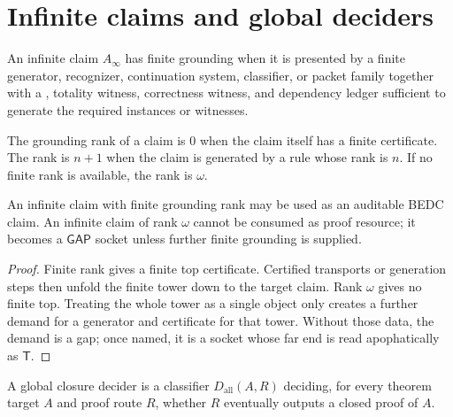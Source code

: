 \section{Infinite claims and global deciders}
\label{sec:legitimate-claim-infinite-global}

\begin{definition}
\label{def:claim-finite-grounding}
An infinite claim $A_{\infty}$ has finite grounding when it is presented by
a finite generator, recognizer, continuation system, classifier, or packet
family together with a \NameCert{}, totality witness, correctness witness,
and dependency ledger sufficient to generate the required instances or
witnesses.
\end{definition}

\begin{definition}
\label{def:claim-grounding-rank}
The grounding rank of a claim is $0$ when the claim itself has a finite
certificate.  The rank is $n+1$ when the claim is generated by a rule whose
rank is $n$.  If no finite rank is available, the rank is $\omega$.
\end{definition}

\begin{theorem}
\label{thm:claim-infinite-claim-closure}
An infinite claim with finite grounding rank may be used as an auditable BEDC
claim.  An infinite claim of rank $\omega$ cannot be consumed as proof
resource; it becomes a $\mathsf{GAP}$ socket unless further finite grounding
is supplied.
\end{theorem}

\begin{proof}
Finite rank gives a finite top certificate.  Certified transports or
generation steps then unfold the finite tower down to the target claim.
Rank $\omega$ gives no finite top.  Treating the whole tower as a single
object only creates a further demand for a generator and certificate for
that tower.  Without those data, the demand is a gap; once named, it is a
socket whose far end is read apophatically as $\mathsf{T}$.
\end{proof}

\begin{definition}
\label{def:claim-global-closure-decider}
A global closure decider is a classifier $D_{\mathrm{all}}(A,R)$ deciding,
for every theorem target $A$ and proof route $R$, whether $R$ eventually
outputs a closed proof of $A$.
\end{definition}

